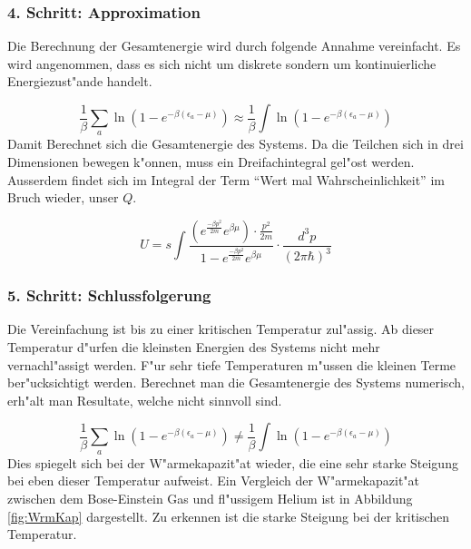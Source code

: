 \begin{refsection}
\subsubsection{4. Schritt: Approximation}
  
Die Berechnung der Gesamtenergie wird durch folgende Annahme vereinfacht. 
Es wird angenommen, dass es sich nicht um diskrete sondern um kontinuierliche Energiezust"ande handelt.

\begin{equation}
\frac{1}{\beta} \sum_{a} \ln(1-e^{-\beta (\epsilon_a -\mu)}) \approx \frac{1}{\beta} \int \ln(1-e^{-\beta (\epsilon_a-\mu)})
\end{equation}
Damit Berechnet sich die Gesamtenergie des Systems.
Da die Teilchen sich in drei Dimensionen bewegen k"onnen, muss ein Dreifachintegral gel"ost werden.
Ausserdem findet sich im Integral der Term ``Wert mal Wahrscheinlichkeit'' im Bruch wieder, unser $Q$.

\begin{equation}
U = s \int  \frac{ \left(e^{ {\frac{- \beta p^2}{2m}} } e^{\beta \mu} \right) \cdot {\frac{p^2}{2m}} }{1-e^{ {\frac{- \beta p^2}{2m}} } e^{\beta \mu}} \cdot \frac{d^3 p}{(2 \pi \hbar)^3}
\end{equation}

\subsubsection{5. Schritt: Schlussfolgerung}

Die Vereinfachung ist bis zu einer kritischen Temperatur zul"assig. Ab dieser Temperatur d"urfen die kleinsten Energien des Systems nicht mehr vernachl"assigt werden. F"ur sehr tiefe Temperaturen m"ussen die kleinen Terme ber"ucksichtigt werden. Berechnet man die Gesamtenergie des Systems numerisch, erh"alt man Resultate, welche nicht sinnvoll sind.

\begin{equation}
\frac{1}{\beta} \sum_{a} \ln(1-e^{-\beta (\epsilon_a-\mu)}) \neq \frac{1}{\beta} \int \ln(1-e^{-\beta (\epsilon_a-\mu)})
\end{equation}
Dies spiegelt sich bei der W"armekapazit"at wieder, die eine sehr starke Steigung bei eben dieser Temperatur aufweist. Ein Vergleich der W"armekapazit"at zwischen dem Bose-Einstein Gas und fl"ussigem Helium ist in Abbildung \ref{fig:WrmKap} dargestellt. Zu erkennen ist die starke Steigung bei der kritischen Temperatur.


\end{refsection}
